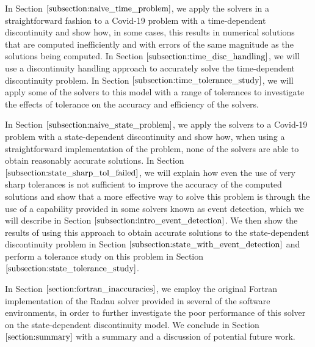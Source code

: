 In Section $\ref{subsection:naive_time_problem}$, we apply the solvers in a straightforward fashion to a Covid-19 problem with a time-dependent discontinuity and show how, in some cases, this results in numerical solutions that are computed inefficiently and with errors of the same magnitude as the solutions being computed. In Section $\ref{subsection:time_disc_handling}$, we will use a discontinuity handling approach to accurately solve the time-dependent discontinuity problem. In Section $\ref{subsection:time_tolerance_study}$, we will apply some of the solvers to this model with a range of tolerances to investigate the effects of tolerance on the accuracy and efficiency of the solvers.

In Section $\ref{subsection:naive_state_problem}$, we apply the solvers to a Covid-19 problem with a state-dependent discontinuity and show how, when using a straightforward implementation of the problem, none of the solvers are able to obtain reasonably accurate solutions. In Section $\ref{subsection:state_sharp_tol_failed}$, we will explain how even the use of very sharp tolerances is not sufficient to improve the 
accuracy of the computed solutions and show that a more effective way to solve this problem is through the use of 
a capability provided in some solvers known as event detection, which we will describe in Section $\ref{subsection:intro_event_detection}$. We then show the results of using this approach to obtain accurate solutions to the state-dependent discontinuity problem in Section $\ref{subsection:state_with_event_detection}$ and perform a tolerance study on this problem in Section $\ref{subsection:state_tolerance_study}$.

In Section $\ref{section:fortran_inaccuracies}$, we employ the original Fortran implementation of the Radau solver provided in several of the software environments, in order to further investigate the poor performance of this solver on the state-dependent discontinuity model. We conclude  in Section $\ref{section:summary}$ with a summary and a discussion of potential  future work.

